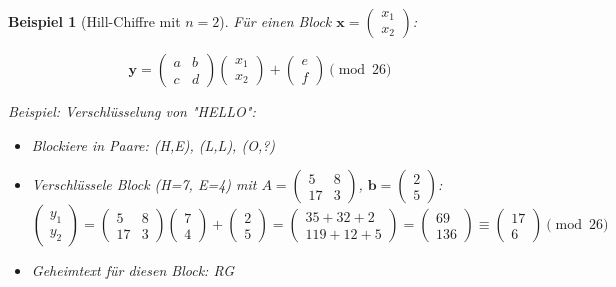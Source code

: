 ﻿\documentclass[12pt,a4paper]{article}
\newtheorem{example}{Beispiel}
\begin{document}
	\begin{example}[Hill-Chiffre mit $n=2$]
		Für einen Block $\mathbf{x} = \begin{pmatrix} x_1 \\ x_2 \end{pmatrix}$:
		
		\begin{equation}
			\mathbf{y} = \begin{pmatrix} a & b \\ c & d \end{pmatrix} \begin{pmatrix} x_1 \\ x_2 \end{pmatrix} + \begin{pmatrix} e \\ f \end{pmatrix} \pmod{26}
		\end{equation}
		
		Beispiel: Verschlüsselung von "HELLO":
		\begin{itemize}
			\item Blockiere in Paare: (H,E), (L,L), (O,?)
			\item Verschlüssele Block (H=7, E=4) mit $A = \begin{pmatrix} 5 & 8 \\ 17 & 3 \end{pmatrix}$, $\mathbf{b} = \begin{pmatrix} 2 \\ 5 \end{pmatrix}$:
			\begin{equation}
				\begin{pmatrix} y_1 \\ y_2 \end{pmatrix} = \begin{pmatrix} 5 & 8 \\ 17 & 3 \end{pmatrix} \begin{pmatrix} 7 \\ 4 \end{pmatrix} + \begin{pmatrix} 2 \\ 5 \end{pmatrix} = \begin{pmatrix} 35 + 32 + 2 \\ 119 + 12 + 5 \end{pmatrix} = \begin{pmatrix} 69 \\ 136 \end{pmatrix} \equiv \begin{pmatrix} 17 \\ 6 \end{pmatrix} \pmod{26}
			\end{equation}
			\item Geheimtext für diesen Block: RG
		\end{itemize}
	\end{example}
	
\end{document}
